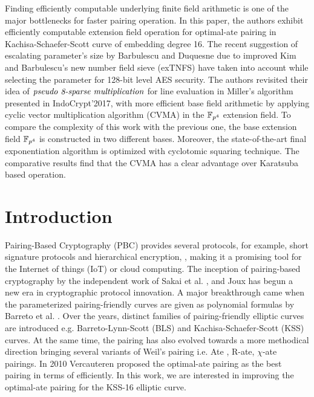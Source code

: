 Finding efficiently computable underlying finite field arithmetic is one of the major bottlenecks for faster pairing operation.
In this paper, the authors exhibit efficiently computable extension field operation for optimal-ate pairing in Kachisa-Schaefer-Scott curve of embedding degree 16. 
The recent suggestion of escalating parameter's size by Barbulescu and Duquesne due to improved Kim and Barbulescu's new number field sieve (exTNFS) have taken into account while selecting the parameter for 128-bit  level AES security.
The authors revisited their idea of $\textit{pseudo 8-sparse multiplication}$ for line evaluation in Miller's algorithm presented in IndoCrypt'2017, with more efficient base field arithmetic by applying cyclic vector multiplication algorithm (CVMA) in the $\mathbb{F}_{p^4}$ extension field.
To compare the complexity of this work with the previous one,
the base extension field $\mathbb{F}_{p^4}$ is constructed in two different bases.
Moreover, the state-of-the-art final exponentiation algorithm is optimized with cyclotomic squaring technique. 
The comparative results find that the CVMA has a clear advantage over Karatsuba based operation.

\section{Introduction}
\label{intro}
Pairing-Based Cryptography (PBC) provides several protocols, for example, short signature protocols and hierarchical encryption,   \cite{C:Shamir84}, making it a promising tool for the Internet of things (IoT) or cloud computing.
The inception of  pairing-based cryptography by the independent work of Sakai et al. \cite{sakai2000cryptosystems}, and Joux \cite{JC:Joux04} has begun a new era in cryptographic protocol innovation.
A major breakthrough came when the parameterized pairing-friendly curves are given as polynomial formulas by Barreto et al. \cite{SAC:BarNae05}. 
Over the years, distinct families of pairing-friendly elliptic curves are introduced e.g. Barreto-Lynn-Scott (BLS) \cite{SCN:BarLynSco02} and Kachisa-Schaefer-Scott (KSS) \cite{EPRINT:KacSchSco07} curves. 
At the same time, the pairing has also evolved towards a more methodical direction bringing several variants of Weil's pairing i.e. Ate \cite{DBLP:reference/crc/2005ehcc}, R-ate\cite{r_ate}, $\chi$-ate \cite{PAIRING:NASKM08} pairings. 
In 2010 Vercauteren proposed the optimal-ate pairing \cite{DBLP:journals/tit/Vercauteren10} as the best pairing in terms of efficiently. 
In this work, we are interested in improving the optimal-ate pairing for the KSS-16 elliptic curve. 

